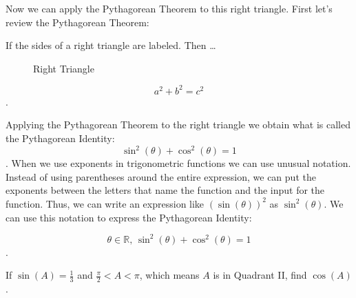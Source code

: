 Now we can apply the Pythagorean Theorem to this right triangle. First let's
review the Pythagorean Theorem:

\begin{theorem}
  \label{thrm:pythagorean_theorem}

  If the sides of a right triangle are labeled. Then \ldots

  \begin{figure}[H]
    \centering


    \caption{Right Triangle}
    \label{fig:pythagorean_theorem}
  \end{figure}

  \[ a^{2} + b^{2} = c^{2} \].
\end{theorem}

Applying the Pythagorean Theorem to the right triangle we obtain what is called
the Pythagorean Identity:
\[ \sin^{2}(\theta) + \cos^{2}(\theta) = 1 \].
When we use exponents in trigonometric functions we can use unusual notation.
Instead of using parentheses around the entire expression, we can put the
exponents between the letters that name the function and the input for the
function. Thus, we can write an expression like $(\sin (\theta))^{2}$ as
$\sin^{2} (\theta)$. We can use this notation to express the Pythagorean
Identity:

\begin{notation}
  \[ \theta \in \mathbb{R} \textrm{, } \sin^{2} (\theta) + \cos^{2} (\theta) = 1 \].
\end{notation}

\begin{exc}
  \label{exc:find_cos}

  If $\sin (A) = \frac{1}{3}$ and $\frac{\pi}{2} < A < \pi$, which means $A$ is
  in Quadrant II, find $\cos (A)$.
\end{exc}

\newpage
